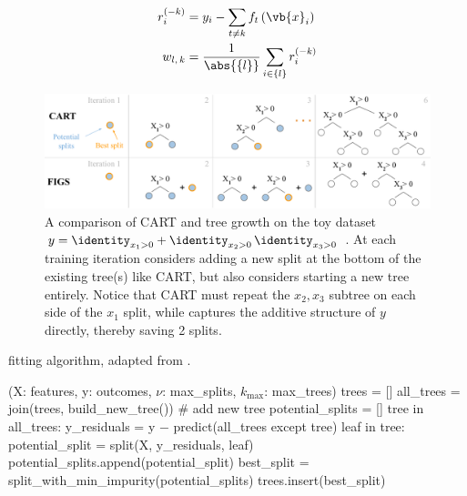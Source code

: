 \begin{subequations}\label{eq:FIGS_eqs}
\begin{align}
r_{i}^{\left(-k\right)} &= y_{i} - \sum_{t \neq k} f_{t}\left(\vb{x}_{i}\right) \label{eq:FIGS:FIGS_eqs:r} \\
w_{l,\,k} &= \frac{1}{\abs{\left\{l\right\}}} \sum_{i \in \left\{l\right\}} r_{i}^{\left(-k\right)} \label{eq:FIGS:FIGS_eqs:weight}
\end{align}
\end{subequations}

\begin{figure}[H]
\centering
\includegraphics[width=\textwidth]{figures/ml/figs_intro_fig}
\caption{
A comparison of CART and \figs tree growth on the toy dataset
$y = \identity_{x_{1} > 0} + \identity_{x_{2} > 0} \, \identity_{x_{3} > 0}$ \cite{FIGS}.
At each training iteration \figs considers adding a new split at the bottom of the existing tree(s) like CART,
but also considers starting a new tree entirely.
Notice that CART must repeat the $x_{2}, x_{3}$ subtree on each side of the $x_{1}$ split,
while \figs captures the additive structure of $y$ directly, thereby saving \num{2} splits.
}
\label{fig:FIGS:intro}
\end{figure}

\begin{algorithm}[h]
  \caption{\figs fitting algorithm, adapted from \cite{FIGS}.}
  \label{algo:FIGS:fit_algo}
  \small
\begin{algorithmic}
  \State {\figs}(X: features, y: outcomes, $\nu$: max\_splits, $k_{\text{max}}$: max\_trees)
  \State trees = []
    \State all\_trees = join(trees, build\_new\_tree()) \textcolor{codegreen}{\# add new tree}
    \State potential\_splits = []
    \For{}\hspace{-3pt}tree in all\_trees:
        \State y\_residuals = y $-$ predict(all\_trees except tree)
        \For{}\hspace{-3pt}leaf in tree:
            \State potential\_split = split(X, y\_residuals, leaf)
            \State potential\_splits.append(potential\_split)
        \EndFor
    \EndFor
    \State best\_split = split\_with\_min\_impurity(potential\_splits)
    \State trees.insert(best\_split)
  \EndWhile
\end{algorithmic}
\end{algorithm}

